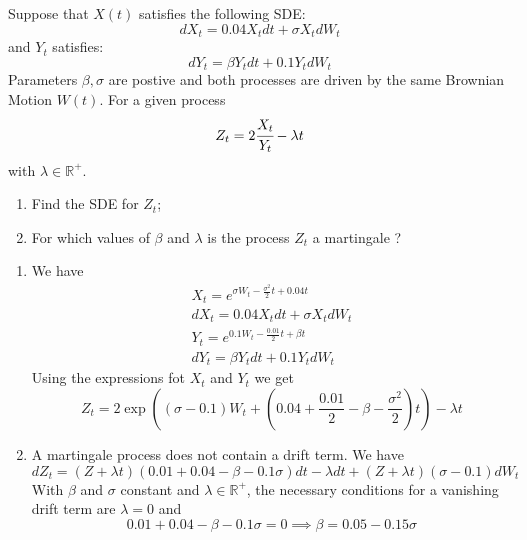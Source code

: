 \documentclass[12pt,a4paper]{exam}
\begin{document}
\begin{questions}
\begin{solution}
\begin{solution}
\question Suppose that $X(t)$ satisfies the following SDE:
\begin{equation*}
dX_t = 0.04X_t dt + \sigma X_t dW_t
\end{equation*}
and $Y_t$ satisfies:
\begin{equation*}
dY_t = \beta Y_t dt + 0.1 Y_t dW_t
\end{equation*}
Parameters $\beta, \sigma$ are postive and both processes are driven by the same Brownian Motion $W(t)$.
For a given process
\begin{equation*}
Z_t = 2\cfrac{X_t}{Y_t}-\lambda t
\end{equation*}
with $\lambda\in\mathbb{R}^+$.
\begin{enumerate}[label=(\alph*),font=\itshape]
\item Find the SDE for $Z_t$;
\item For which values of $\beta$ and $\lambda$ is the process $Z_t$ a martingale ?
\end{enumerate}

\fillwithlines{3cm}
\begin{solution}
\begin{enumerate}[label=(\alph*),font=\itshape]
\item We have 
\begin{equation*}
\begin{gathered}
X_t = e^{\sigma W_t-\frac{\sigma^2}{2}t+0.04 t}\\
dX_t = 0.04 X_t dt + \sigma X_t dW_t\\
Y_t = e^{0.1W_t -\frac{0.01}{2}t+\beta t}\\
dY_t = \beta Y_t dt + 0.1 Y_t dW_t
\end{gathered}
\end{equation*}
Using the expressions fot $X_t$ and $Y_t$ we get
\begin{equation*}
Z_t = 2\exp\left((\sigma-0.1)W_t + (0.04+\frac{0.01}{2}-\beta-\frac{\sigma^2}{2})t\right)-\lambda t
\end{equation*}
\item A martingale process does not contain a drift term. We have 
\begin{equation*}
dZ_t = (Z+\lambda t)(0.01+0.04-\beta-0.1\sigma)dt-\lambda dt + (Z+\lambda t)(\sigma-0.1)dW_t
\end{equation*}
With $\beta$ and $\sigma$ constant and $\lambda\in\mathbb{R}^+$, the necessary conditions for a vanishing drift term are $\lambda=0$ and
\begin{equation*}
0.01+0.04-\beta-0.1\sigma=0\implies \beta=0.05-0.15\sigma
\end{equation*}
\end{enumerate}
\end{solution}


\end{solution}
\end{solution}
\end{questions}
\end{document}
